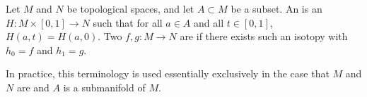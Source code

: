 \begin{definition} \label{definition:isotopy_between_topological_spaces_between_homeomorphisms_relative_to_a_subspace}
Let $M$ and $N$ be topological spaces, and let $A \subset M$ be a subset. An  is an  $H: M \times [0, 1] \to N$ such that for all $a \in A$ and all $t \in [0, 1]$, $H(a, t) = H(a, 0)$. Two  $f, g: M \to N$ are  if there exists such an isotopy with $h_0 = f$ and $h_1 = g$.

In practice, this terminology is used essentially exclusively in the case that $M$ and $N$ are  and $A$ is a submanifold of $M$.
\end{definition}
